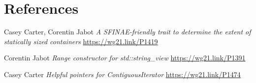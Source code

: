 \documentclass{wg21}
\begin{document}
\section{References}
\renewcommand{\section}[2]{}%
\begin{thebibliography}{9}

    Casey Carter, Corentin Jabot
    \emph{A SFINAE-friendly trait to determine the extent of statically sized containers}\newline
    \url{https://wg21.link/P1419}

    Corentin Jabot
    \emph{Range constructor for std::string\_view}\newline
    \url{https://wg21.link/P1391}


    Casey Carter
    \emph{Helpful pointers for ContiguousIterator}\newline
    \url{https://wg21.link/P1474}


\end{thebibliography}
\end{document}
